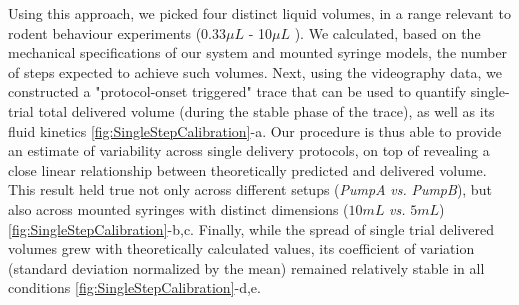 Using this approach, we picked four distinct liquid volumes, in a range relevant to rodent behaviour experiments (0.33$\mu L$ - 10$\mu L$ ). We calculated, based on the mechanical specifications of our system and mounted syringe models, the number of steps expected to achieve such volumes. Next, using the videography data, we constructed a "protocol-onset triggered" trace that can be used to quantify single-trial total delivered volume (during the stable phase of the trace), as well as its fluid kinetics \ref{fig:SingleStepCalibration}-a. Our procedure is thus able to provide an estimate of variability across single delivery protocols, on top of revealing a close linear relationship between theoretically predicted and delivered volume. This result held true not only across different setups (\textit{PumpA} \textit{vs.} \textit{PumpB}), but also across mounted syringes with distinct dimensions ($10mL$ \textit{vs.} $5mL$) \ref{fig:SingleStepCalibration}-b,c. Finally, while the spread of single trial delivered volumes grew with theoretically calculated values, its coefficient of variation (standard deviation normalized by the mean) remained relatively stable in all conditions \ref{fig:SingleStepCalibration}-d,e.

